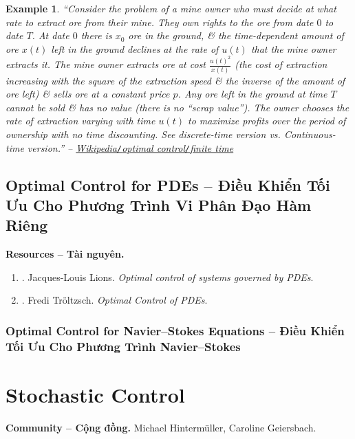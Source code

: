 \documentclass{article}
\newtheorem{example}{Example}
\begin{document}
\begin{example}
	``Consider the problem of a mine owner who must decide at what rate to extract ore from their mine. They own rights to the ore from date $0$ to date $T$. At date $0$ there is $x_0$ ore in the ground, \& the time-dependent amount of ore $x(t)$ left in the ground declines at the rate of $u(t)$ that the mine owner extracts it. The mine owner extracts ore at cost $\frac{u(t)^2}{x(t)}$ (the cost of extraction increasing with the square of the extraction speed \& the inverse of the amount of ore left) \& sells ore at a constant price $p$. Any ore left in the ground at time $T$ cannot be sold \& has no value (there is no ``scrap value''). The owner chooses the rate of extraction varying with time $u(t)$ to maximize profits over the period of ownership with no time discounting. See discrete-time version vs. Continuous-time version.'' -- \href{https://en.wikipedia.org/wiki/Optimal_control#Finite_time}{Wikipedia{\tt/}optimal control{\tt/}finite time}
\end{example}

\subsection{Optimal Control for PDEs -- Điều Khiển Tối Ưu Cho Phương Trình Vi Phân Đạo Hàm Riêng}
\textbf{\textsf{Resources -- Tài nguyên.}}
\begin{enumerate}
	\item \cite{Lions1971}. {\sc Jacques-Louis Lions}. {\it Optimal control of systems governed by PDEs}.
	\item \cite{Troltzsch2010}. {\sc Fredi Tr\"{o}ltzsch}. {\it Optimal Control of PDEs}.
\end{enumerate}

\subsubsection{Optimal Control for Navier--Stokes Equations -- Điều Khiển Tối Ưu Cho Phương Trình Navier--Stokes}


\section{Stochastic Control}
\textbf{\textsf{Community -- Cộng đồng.}} {\sc Michael Hinterm\"uller, Caroline Geiersbach}.
\end{document}
